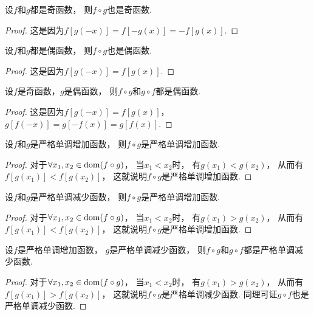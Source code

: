 \begin{proposition}
设\(f\)和\(g\)都是奇函数，
则\(f \circ g\)也是奇函数.
\begin{proof}
这是因为\(f[g(-x)]
= f[-g(x)]
= -f[g(x)]\).
\end{proof}
\end{proposition}

\begin{proposition}
设\(f\)和\(g\)都是偶函数，
则\(f \circ g\)也是偶函数.
\begin{proof}
这是因为\(f[g(-x)]
= f[g(x)]\).
\end{proof}
\end{proposition}

\begin{proposition}
设\(f\)是奇函数，\(g\)是偶函数，
则\(f \circ g\)和\(g \circ f\)都是偶函数.
\begin{proof}
这是因为\(f[g(-x)]
= f[g(x)]\)，
\(g[f(-x)]
= g[-f(x)]
= g[f(x)]\).
\end{proof}
\end{proposition}

\begin{proposition}
设\(f\)和\(g\)是严格单调增加函数，
则\(f \circ g\)是严格单调增加函数.
\begin{proof}
对于\(\forall x_1,x_2 \in \operatorname{dom}(f \circ g)\)，
当\(x_1 < x_2\)时，
有\(g(x_1) < g(x_2)\)，
从而有\(f[g(x_1)] < f[g(x_2)]\)，
这就说明\(f \circ g\)是严格单调增加函数.
\end{proof}
\end{proposition}

\begin{proposition}
设\(f\)和\(g\)是严格单调减少函数，
则\(f \circ g\)是严格单调增加函数.
\begin{proof}
对于\(\forall x_1,x_2 \in \operatorname{dom}(f \circ g)\)，
当\(x_1 < x_2\)时，
有\(g(x_1) > g(x_2)\)，
从而有\(f[g(x_1)] < f[g(x_2)]\)，
这就说明\(f \circ g\)是严格单调增加函数.
\end{proof}
\end{proposition}

\begin{proposition}
设\(f\)是严格单调增加函数，
\(g\)是严格单调减少函数，
则\(f \circ g\)和\(g \circ f\)都是严格单调减少函数.
\begin{proof}
对于\(\forall x_1,x_2 \in \operatorname{dom}(f \circ g)\)，
当\(x_1 < x_2\)时，
有\(g(x_1) > g(x_2)\)，
从而有\(f[g(x_1)] > f[g(x_2)]\)，
这就说明\(f \circ g\)是严格单调减少函数.
同理可证\(g \circ f\)也是严格单调减少函数.
\end{proof}
\end{proposition}
